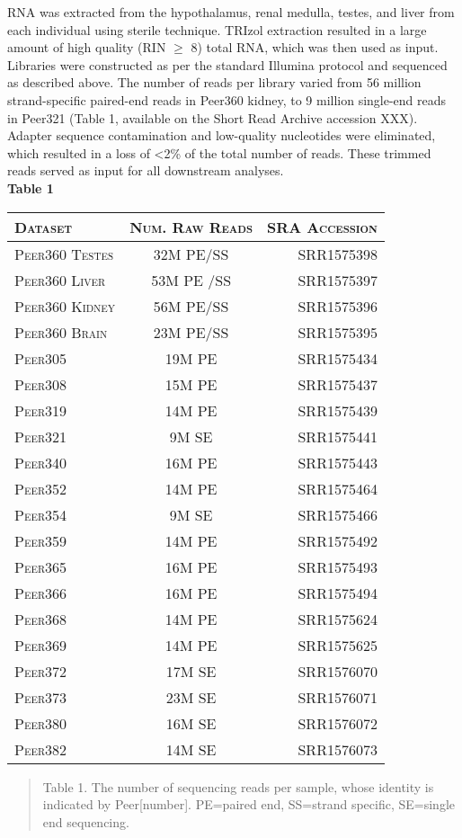 \documentclass[12pt]{article}
\begin{document}
RNA was extracted from the hypothalamus, renal medulla, testes, and liver from each individual using sterile technique. TRIzol extraction resulted in a large amount of high quality (RIN $\geq$ 8) total RNA, which was then used as input. Libraries were constructed as per the standard Illumina protocol and sequenced as described above. The number of reads per library varied from 56 million strand-specific paired-end reads in Peer360 kidney, to 9 million single-end reads in Peer321 (\hypertarget{Table 1}{Table 1}, available on the Short Read Archive accession XXX). Adapter sequence contamination and low-quality nucleotides were eliminated, which resulted in a loss of \textless 2\% of the total number of reads. These trimmed reads served as input for all downstream analyses. \\
\textbf{\hypertarget{Table 1}{Table 1}} \\
\begin{center}
\begin{tabular}{l|c | r}
\textsc{Dataset}& \textsc{Num. Raw Reads} & \textsc{SRA Accession} \\
\hline 
\textsc{Peer360 Testes} & 32M PE/SS  & SRR1575398 \\
\textsc{Peer360 Liver} & 53M PE /SS & SRR1575397 \\
\textsc{Peer360 Kidney} & 56M PE/SS  & SRR1575396 \\
\textsc{Peer360 Brain}  & 23M PE/SS & SRR1575395\\
\textsc{Peer305}  & 19M PE  & SRR1575434  \\
\textsc{Peer308}  & 15M PE  & SRR1575437 \\
\textsc{Peer319}  & 14M PE  & SRR1575439\\
\textsc{Peer321}  & 9M SE  & SRR1575441 \\
\textsc{Peer340}  & 16M PE  & SRR1575443 \\
\textsc{Peer352}  & 14M PE  & SRR1575464 \\
\textsc{Peer354}  & 9M SE  & SRR1575466 \\
\textsc{Peer359}  & 14M PE  & SRR1575492 \\
\textsc{Peer365}  & 16M PE & SRR1575493 \\
\textsc{Peer366}  & 16M PE & SRR1575494 \\
\textsc{Peer368}  & 14M PE  & SRR1575624\\
\textsc{Peer369}  & 14M PE  & SRR1575625\\
\textsc{Peer372}  & 17M SE  & SRR1576070\\
\textsc{Peer373}  & 23M SE  & SRR1576071\\
\textsc{Peer380}  & 16M SE  & SRR1576072 \\
\textsc{Peer382}  & 14M SE  & SRR1576073 \\
\end{tabular}
\begin{quote}
\small{Table 1. The number of sequencing reads per sample, whose identity is indicated by Peer[number]. PE=paired end, SS=strand specific, SE=single end sequencing. }
\end{quote}
\end{center}
\end{document}
